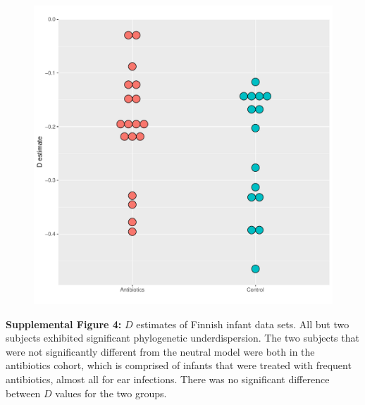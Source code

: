 \documentclass{article}
\begin{document}
{\begin{figure}[t]
	\centering
	\includegraphics[scale=0.80]{figs/Fig_S4.pdf}
\end{figure}
\textbf{Supplemental Figure 4:}\label{sec:figureS4} \(D\) estimates of Finnish infant data sets. All but two subjects exhibited significant phylogenetic underdispersion. The two subjects that were not significantly different from the neutral model were both in the antibiotics cohort, which is comprised of infants that were treated with frequent antibiotics, almost all for ear infections. There was no significant difference between \(D\) values for the two groups. 
\newpage

}
\end{document}
